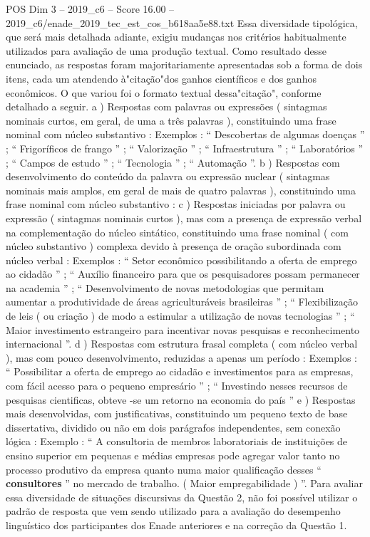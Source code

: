 \begin{textsample}{POS Dim 3 – 2019\_c6 – Score 16.00 – 2019\_c6/enade\_2019\_tec\_est\_cos\_b618aa5e88.txt}
Essa diversidade tipológica, que será mais detalhada adiante, exigiu mudanças nos critérios habitualmente utilizados para avaliação de uma produção textual.
Como resultado desse enunciado, as respostas foram majoritariamente apresentadas sob a forma de dois itens, cada um atendendo à"citação"dos ganhos científicos e dos ganhos econômicos.
O que variou foi o formato textual dessa"citação", conforme detalhado a seguir. a ) Respostas com palavras ou expressões ( sintagmas nominais curtos, em geral, de uma a três palavras ), constituindo uma frase nominal com núcleo substantivo : Exemplos : “ Descobertas de algumas doenças ” ; “ Frigoríficos de frango ” ; “ Valorização ” ; “ Infraestrutura ” ; “ Laboratórios ” ; “ Campos de estudo ” ; “ Tecnologia ” ; “ Automação ”. b ) Respostas com desenvolvimento do conteúdo da palavra ou expressão nuclear ( sintagmas nominais mais amplos, em geral de mais de quatro palavras ), constituindo uma frase nominal com núcleo substantivo : c ) Respostas iniciadas por palavra ou expressão ( sintagmas nominais curtos ), mas com a presença de expressão verbal na complementação do núcleo sintático, constituindo uma frase nominal ( com núcleo substantivo ) complexa devido à presença de oração subordinada com núcleo verbal : Exemplos : “ Setor econômico possibilitando a oferta de emprego ao cidadão ” ; “ Auxílio financeiro para que os pesquisadores possam permanecer na academia ” ; “ Desenvolvimento de novas metodologias que permitam aumentar a produtividade de áreas agriculturáveis brasileiras ” ; “ Flexibilização de leis ( ou criação ) de modo a estimular a utilização de novas tecnologias ” ; “ Maior investimento estrangeiro para incentivar novas pesquisas e reconhecimento internacional ”. d ) Respostas com estrutura frasal completa ( com núcleo verbal ), mas com pouco desenvolvimento, reduzidas a apenas um período : Exemplos : “ Possibilitar a oferta de emprego ao cidadão e investimentos para as empresas, com fácil acesso para o pequeno empresário ” ; “ Investindo nesses recursos de pesquisas cientificas, obteve -se um retorno na economia do país ” e ) Respostas mais desenvolvidas, com justificativas, constituindo um pequeno texto de base dissertativa, dividido ou não em dois parágrafos independentes, sem conexão lógica : Exemplo : “ A consultoria de membros laboratoriais de instituições de ensino superior em pequenas e médias empresas pode agregar valor tanto no processo produtivo da empresa quanto numa maior qualificação desses “ \textbf{consultores} ” no mercado de trabalho. ( Maior empregabilidade ) ”.
Para avaliar essa diversidade de situações discursivas da Questão 2, não foi possível utilizar o padrão de resposta que vem sendo utilizado para a avaliação do desempenho linguístico dos participantes dos Enade anteriores e na correção da Questão 1.

\end{textsample}

